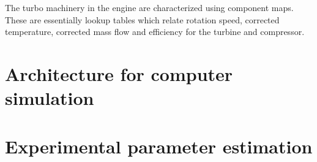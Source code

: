 \documentclass[tcc]{subfiles}
\begin{document}
The turbo machinery in the engine are characterized using component maps.
 These are essentially lookup tables which relate 
 rotation speed, corrected temperature, corrected mass flow and efficiency
 for the turbine and compressor.


\section{Architecture for computer simulation}
\section{Experimental parameter estimation}
\end{document}
